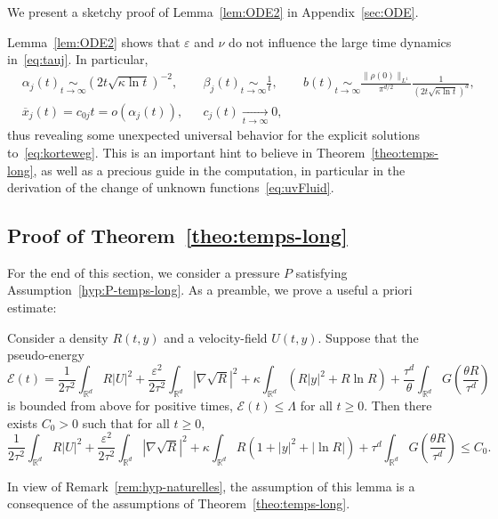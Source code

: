 \documentclass[AHL,Unicode,longabstracts]{cedram}
\newcommand*\R{\mathbb{R}}
\newcommand*\<{\left\langle}
\renewcommand*\>{\right\rangle}
\renewcommand*\le{\leqslant}
\renewcommand*\ge{\geqslant}
\newcommand*\Eq[2]{\mathop{\sim}\limits_{#1\rightarrow#2}}
\newcommand*\Tend[2]{\mathop{\longrightarrow}\limits_{#1\rightarrow#2}}
\newcommand*\eps{\varepsilon}
\begin{document}
We present a sketchy proof of Lemma~\ref{lem:ODE2} in Appendix~\ref{sec:ODE}.

Lemma~\ref{lem:ODE2} shows that $\eps$ and $\nu$ do not influence the large time dynamics in~\eqref{eq:tauj}. In particular,
\[
\begin{aligned}
&\alpha_j(t)\Eq t \infty \left(2t\sqrt{\kappa \ln t}\right)^{-2},&&
\beta_j(t)\Eq t \infty \frac{1}{t}, && b(t)\Eq t \infty \frac{\|\rho(0)\|_{L^1}}{\pi^{d/2}}\frac{1}{(2t\sqrt{\kappa \ln t})^{d}},\\
& \overline x_j(t)=c_{0j}t=o\left(\alpha_j(t)\right),&& c_j(t)\Tend t \infty 0,
\end{aligned}
\]
thus revealing some unexpected universal behavior for the explicit solutions to~\eqref{eq:korteweg}. This is an important hint to believe in Theorem~\ref{theo:temps-long}, as well as a precious guide in the computation, in particular in the derivation of the change of unknown functions~\eqref{eq:uvFluid}.


\subsection{Proof of Theorem~\ref{theo:temps-long}}\label{sec:convergence}

For the end of this section, we consider a pressure $P$ satisfying Assumption~\ref{hyp:P-temps-long}. As a preamble, we prove a useful a priori estimate:

\begin{lemm}\label{lem:aprioriE}
Consider a density $R(t,y)$ and a velocity-field $U(t,y).$ Suppose that the pseudo-energy
\begin{equation*}
\mathcal E(t) = \frac{1}{2\tau^2}\int_{\R^d} R|U|^2+\frac{\eps^2}{2\tau^2} \int_{\R^d}|\nabla \sqrt R|^2 +\kappa\int_{\R^d} (R|y|^2 + R \ln R) +
\frac{\tau^d}{\theta}\int_{\R^d} G\left(\frac{ \theta R}{\tau^d}\right)
\end{equation*}
is bounded from above for positive times, $\mathcal E(t)\le
\Lambda$ for all $t\ge 0$. Then there exists $C_0>0$ such that for all $t\ge 0$,
\begin{equation*}
\frac{1}{2\tau^2}\int_{\R^d} R|U|^2 +\frac{\eps^2}{2\tau^2} \int_{\R^d}|\nabla \sqrt R|^2 + \kappa \int_{\R^d} R (1+|y|^2 + |\ln R|) +
\tau^d\int_{\R^d} G\left(\frac{ \theta R}{\tau^d}\right)
\le C_0.
\end{equation*}
\end{lemm}

In view of Remark~\ref{rem:hyp-naturelles}, the assumption of this lemma is a consequence of the assumptions of Theorem~\ref{theo:temps-long}.
\end{document}
